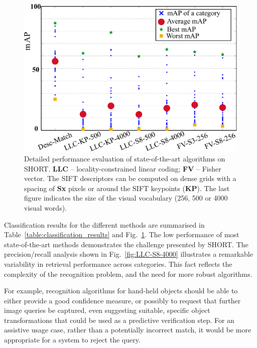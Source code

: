 \begin{figure}[]
\begin{center}
\includegraphics[width=\linewidth]{./gfx/Chapter03/methods-v5.pdf}
\caption{Detailed performance evaluation of state-of-the-art algorithms on SHORT. \textbf{LLC} -- locality-constrained linear coding; \textbf{FV} -- Fisher vector. The SIFT descriptors can be computed on dense grids with a spacing of \textbf{Sx} pixels or around the SIFT keypoints (\textbf{KP}). The last figure indicates the size of the visual vocabulary (256, 500 or 4000 visual words).}
\label{fig:methods}
\end{center}
\end{figure}




Classification results for the different methods are summarised in Table~\ref{table:classification_results}  and Fig.~\ref{fig:methods}. The low performance of most state-of-the-art methods demonstrates the challenge presented by SHORT. The precision/recall analysis shown in Fig.~\ref{fig:LLC-S8-4000} illustrates a remarkable variability in retrieval performance across categories. This fact reflects the complexity of the recognition problem, and the need for more robust algorithms. 

For example, recognition algorithms for hand-held objects should be able to either provide a good confidence measure, or possibly to request that further image queries be captured, even suggesting suitable, specific object transformations that could be used as a predictive verification step. For an assistive usage case, rather than a potentially incorrect match, it would be more appropriate for a system to reject the query.

